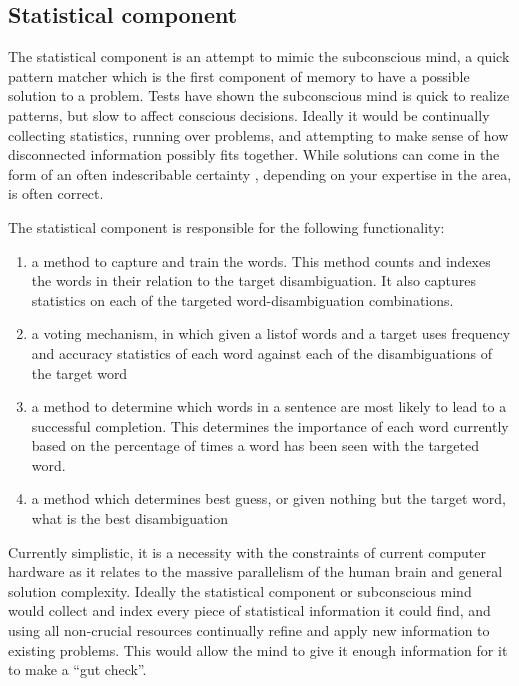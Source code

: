 \subsection{Statistical component} 

The statistical component is an attempt to
mimic the subconscious mind, a quick pattern matcher which is the first
component of memory to have a possible solution to a problem.  Tests have shown
\cite{BLINK} the subconscious mind is quick to realize patterns, but slow to
affect conscious decisions. Ideally it would be continually collecting
statistics, running over problems, and attempting to make sense of how
disconnected information possibly fits together.  While solutions can come in
the form of an often indescribable certainty \cite{BLINK}, depending on your
expertise in the area, is often correct.

The statistical component is responsible for the following functionality:

\begin{enumerate}     
	\item a method to capture and train the words.  This method counts and 
	indexes the words in their relation to the target disambiguation. It also 
	captures statistics on each of the targeted word-disambiguation 
	combinations.     
	\item a voting mechanism, in which given a listof words and a target uses 
	frequency and accuracy statistics of each word against each of the 
	disambiguations of the target word
	\item a method to determine which words in a sentence are most likely to 
	lead to a successful completion.  This determines the importance of each 
	word currently based on the percentage of times a word has been seen with 
	the targeted word.     
	\item a method which determines best guess, or given nothing but the target 
	word, what is the best disambiguation 
\end{enumerate}

Currently simplistic, it is a necessity with the constraints of current computer
hardware as it relates to the massive parallelism of the human brain and general
solution complexity.  Ideally the statistical component or subconscious mind
would collect and index every piece of statistical information it could find,
and using all non-crucial resources continually refine and apply new information
to existing problems.  This would allow the mind to give it enough information
for it to make a ``gut check''.

